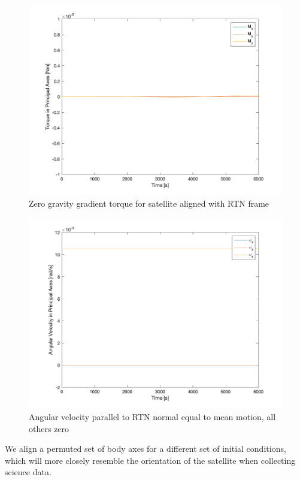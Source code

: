 \begin{figure}[H]
\centering
\includegraphics[scale=0.6]{Images/ps4_problem4d_torque.png}
\caption{Zero gravity gradient torque for satellite aligned with RTN frame}
\label{fig:ps4_problem4d_torque}
\end{figure}

\begin{figure}[H]
\centering
\includegraphics[scale=0.6]{Images/ps4_problem4d_angvel.png}
\caption{Angular velocity parallel to RTN normal equal to mean motion, all others zero}
\label{fig:ps4_problem4d_angvel}
\end{figure}

We align a permuted set of body axes for a different set of initial conditions, which will more closely resemble the orientation of the satellite when collecting science data.

